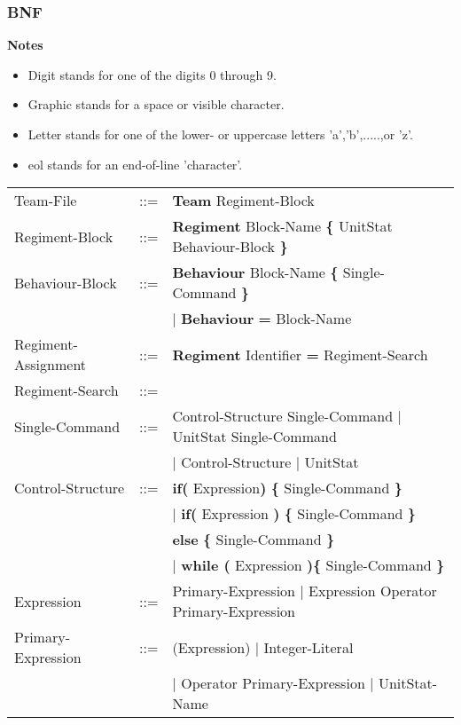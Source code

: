 	\subsubsection{BNF}
		{\bf Notes}
		\begin{itemize}
			\item Digit stands for one of the digits 0 through 9.
			\item Graphic stands for a space or visible character.
			\item Letter stands for one of the lower- or uppercase letters 'a','b',.....,or 'z'.
			\item eol stands for an end-of-line 'character'.
		\end{itemize}
		\begin{center}
			\begin{tabular}{ l l l }
				Team-File		   &	::=	 & {\bf Team} Regiment-Block \\
				Regiment-Block     &	::=	 & {\bf Regiment} Block-Name {\bf \{ } UnitStat Behaviour-Block \bf{\} }\\
				Behaviour-Block	   &	::=	 & {\bf Behaviour} Block-Name {\bf \{} Single-Command {\bf \}}  \\
								   &         & $\mid$ {\bf Behaviour} {\bf = } Block-Name \\
				Regiment-Assignment&    ::=  &{\bf Regiment} Identifier {\bf =} Regiment-Search\\
				Regiment-Search	   &	::=	 &	 \\
				Single-Command     &	::=  & Control-Structure Single-Command $\mid$ UnitStat Single-Command \\
								   &		 & $\mid$ Control-Structure $\mid$ UnitStat					\\
				Control-Structure  &  	::=  & {\bf if( } Expression{\bf )} {\bf \{ } Single-Command {\bf \} }  \\
								   &		 & $\mid$ {\bf if(} Expression {\bf )} {\bf \{ }Single-Command {\bf \}} \\
								   &   		 & {\bf else } {\bf \{ }Single-Command {\bf \} } \\					   
								   &   		 & $\mid$ {\bf while (} Expression {\bf )}{\bf \{ } Single-Command {\bf \}} \\
				Expression 		   &	::=	 & Primary-Expression $\mid$ Expression Operator Primary-Expression \\
				Primary-Expression &	::=  & (Expression) $\mid$ Integer-Literal \\
								   &		 & $\mid$ Operator Primary-Expression $\mid$ UnitStat-Name \\

\end{tabular}
\end{center}
